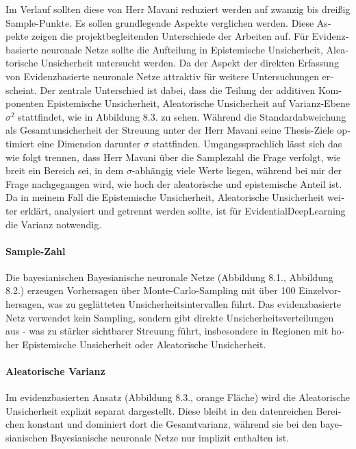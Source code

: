 \begin{otherlanguage}{ngerman}
Im Verlauf sollten diese von Herr Mavani reduziert werden auf zwanzig bis dreißig Sample-Punkte. Es sollen grundlegende Aspekte verglichen werden. Diese Aspekte zeigen die projektbegleitenden Unterschiede der Arbeiten auf. Für \gls{Evidenzbasierte neuronale Netze} sollte die Aufteilung in \gls{Epistemische Unsicherheit}, \gls{Aleatorische Unsicherheit} untersucht werden. Da der Aspekt der direkten Erfassung von \gls{Evidenzbasierte neuronale Netze} attraktiv für weitere Untersuchungen erscheint. Der zentrale Unterschied ist dabei, dass die Teilung der additiven Komponenten \gls{Epistemische Unsicherheit}, \gls{Aleatorische Unsicherheit} auf Varianz-Ebene $\sigma^{2}$ stattfindet, wie in Abbildung 8.3. zu sehen. Während die Standardabweichung als Gesamtunsicherheit der Streuung unter der Herr Mavani seine Thesis-Ziele optimiert eine Dimension darunter $\sigma$ stattfinden. Umgangssprachlich lässt sich das wie folgt trennen, dass Herr Mavani über die Samplezahl die Frage verfolgt, wie breit ein Bereich sei, in dem $\sigma$-abhängig viele Werte liegen, während bei mir der Frage nachgegangen wird, wie hoch der aleatorische und epistemische Anteil ist. Da in meinem Fall die \gls{Epistemische Unsicherheit}, \gls{Aleatorische Unsicherheit} weiter erklärt, analysiert und getrennt werden sollte, ist für \gls{EvidentialDeepLearning} die Varianz notwendig.

\paragraph{Sample-Zahl} Die \gls{bayesianischen Bayesianische neuronale Netze} (Abbildung 8.1., Abbildung 8.2.) erzeugen Vorhersagen über Monte-Carlo-Sampling mit über 100 Einzelvorhersagen, was zu geglätteten Unsicherheitsintervallen führt. Das evidenzbasierte Netz verwendet kein Sampling, sondern gibt direkte Unsicherheitsverteilungen aus - was zu stärker sichtbarer Streuung führt, insbesondere in Regionen mit hoher \gls{Epistemische Unsicherheit} oder \gls{Aleatorische Unsicherheit}.

\paragraph{Aleatorische Varianz} Im evidenzbasierten Ansatz (Abbildung 8.3., orange Fläche) wird die \gls{Aleatorische Unsicherheit} explizit separat dargestellt. Diese bleibt in den datenreichen Bereichen konstant und dominiert dort die Gesamtvarianz, während sie bei den \gls{bayesianischen Bayesianische neuronale Netze} nur implizit enthalten ist.


\end{otherlanguage}
